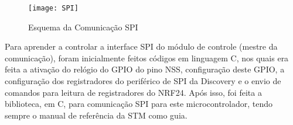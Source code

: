 \begin{figure}
	\centering
	\texttt{[image: SPI]}
	\caption{Esquema da Comunicação SPI}
	\label{fig:spi}
\end{figure}

Para aprender a controlar a interface SPI do módulo de controle (mestre da comunicação), foram inicialmente feitos códigos em linguagem C, nos quais era feita a ativação do relógio do GPIO do pino NSS, configuração deste GPIO, a configuração dos registradores do periférico de SPI da Discovery e o envio de comandos para leitura de registradores do NRF24.
Após isso, foi feita a biblioteca, em C, para comunicação SPI para este microcontrolador, tendo sempre o manual de referência da STM como guia.


